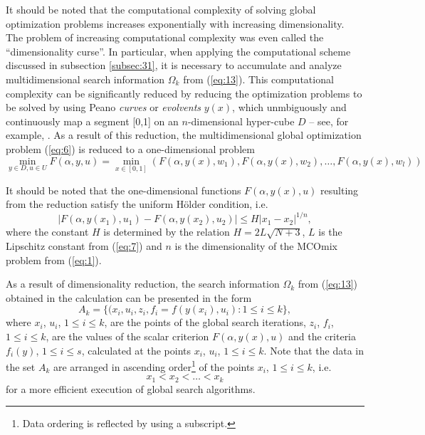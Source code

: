 \documentclass{svproc}
\begin{document}
It should be noted that the computational complexity of solving global optimization problems increases exponentially with increasing dimensionality. The problem of increasing computational complexity was even called the ``dimensionality curse''. In particular, when applying the computational scheme discussed in subsection \ref{subsec:31}, it is necessary to accumulate and analyze multidimensional search information $\Omega_k$ from (\ref{eq:13}). This computational complexity can be significantly reduced by reducing the optimization problems to be solved by using Peano \textit{curves} or \textit{evolvents} $y(x)$, which unmbiguously and continuously map a segment [0,1] on an $n$-dimensional hyper-cube $D$ -- see, for example, \cite{c24,c25}. As a result of this reduction, the multidimensional global optimization problem (\ref{eq:6}) is reduced to a one-dimensional problem
\begin{equation}\label{eq:15}
 \min_{y\in D, u \in U}F(\alpha,y,u) = \min_{x \in [0,1]}(F(\alpha,y(x),w_1 ),F(\alpha,y(x),w_2 ),\dots,F(\alpha,y(x),w_l ))
\end{equation}

It should be noted that the one-dimensional functions $F(\alpha,y(x),u)$ resulting from the reduction satisfy the uniform H{\" o}lder condition, i.e.
\begin{equation}\label{eq:16}
|F(\alpha, y(x_1),u_1)-F(\alpha, y(x_2),u_2)| \leq H|x_1-x_2 |^{1/n},
\end{equation}
where the constant $H$ is determined by the relation $H=2L\sqrt{N+3}$, $L$ is the Lipschitz constant from (\ref{eq:7}) and $n$ is the dimensionality of the MCOmix problem from (\ref{eq:1}). 

As a result of dimensionality reduction, the search information $\Omega_k$ from (\ref{eq:13}) obtained in the calculation can be presented in the form 
\begin{equation}\label{eq:17}
A_k=\{(x_i, u_i, z_i, f_i = f(y(x_i), u_i): 1 \leq i \leq k \},
\end{equation}
where $x_i$, $u_i$, $1 \leq i \leq k$,  are the points of the global search iterations, $z_i$, $f_i$, $1 \leq i \leq k$,  are the values of the scalar criterion $F(\alpha,y(x),u)$ and the criteria $f_i (y)$, $1 \leq i \leq s$, calculated at the points $x_i$, $u_i$, $1 \leq i \leq k$. Note that the data in the set $A_k$ are arranged in ascending order\footnote{Data ordering is reflected by using a subscript.} of the points $x_i$, $1 \leq i \leq k$, i.e.
\begin{equation}\label{eq:18}
 x_1< x_2< \dots < x_k
\end{equation}
for a more efficient execution of global search algorithms.
\end{document}
